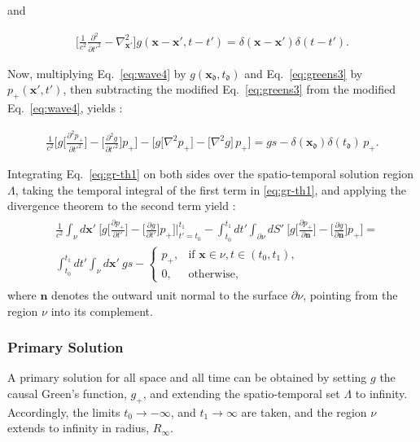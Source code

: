 \documentclass[11pt,reqno]{amsart}
\theoremstyle{remark}
\theoremstyle{italic_lemma}
\newcommand{\bx}{\boldsymbol{x}}
\newcommand{\bn}{\boldsymbol{n}}
\newcommand{\fd}{\mathfrak{d}}
\begin{document}
\noindent
and 

\begin{align}  \label{eq:greens3}
    \bigg[ \frac{1}{c^2} \frac{\partial^2}{\partial {t'}^2} - \nabla_{\bx'}^2 \bigg] g(\bx - \bx', t - t') = \delta(\bx - \bx') \delta(t - t').
\end{align}
\noindent


Now, multiplying Eq.~\eqref{eq:wave4} by $g(\bx_{\fd}, t_{\fd})$ and Eq.~\eqref{eq:greens3} by $p_+(\bx', t')$, then subtracting the modified Eq.~\eqref{eq:greens3} from the modified Eq.~\eqref{eq:wave4}, yields \cite{Devaney}:

\begin{align} \label{eq:gr-th1}
    \frac{1}{c^2} \bigg[g  \big[ \frac{\partial^2 p_+}{\partial {t'}^2} \big]
    - \big[ \frac{\partial^2 g}{\partial {t'}^2} \big] p_+ \bigg] 
    - \bigg[g \big[ \nabla^2 p_+\big] - \big[ \nabla^2 g \big] \, p_+ \bigg] = g s - \delta(\bx_{\fd}) \delta(t_{\fd}) \, p_+.
\end{align}


Integrating Eq.~\eqref{eq:gr-th1} on both sides over the spatio-temporal solution region \( \Lambda \), taking the temporal integral of the first term in \eqref{eq:gr-th1}, and applying the divergence theorem to the second term yield \cite{Devaney}:
\begin{align} \label{eq:gr-th2}
\begin{split}
    & \frac{1}{c^2} \int_\nu d\bx' \ 
    \bigg[g \big[ \frac{\partial p_+}{\partial t'} \big] - \big[ \frac{\partial g}{\partial t'} \big] p_+ \bigg] 
    \bigg|_{t' = t_0}^{t_1} 
    - \int_{t_0}^{t_1} \! dt' \int_{\partial \nu} \! dS' \ 
    \bigg[  g \big[ \frac{\partial p_+}{\partial \bn} \big]  - \big[ \frac{\partial g}{\partial \bn} \big] p_+  \bigg] = \\
    & \int_{t_0}^{t_1} \! dt' \int_\nu \! d\bx' \ g s - 
    \begin{cases}
        p_+, & \text{if } \bx \in \nu, t \in (t_0, t_1), \\
        0, & \text{otherwise},
    \end{cases}
\end{split}
\end{align}
where $\bn$ denotes the outward unit normal to the surface 
$\partial \nu$, pointing from the region $\nu$ into its complement.




\subsubsection{Primary Solution} \label{sec:gr-pri}
A primary solution for all space and all time can be obtained by setting \( g \) the causal Green's function, \( g_+ \), and extending the spatio-temporal set \( \Lambda \) to infinity. Accordingly, the limits \( t_0 \to -\infty \), and \( t_1 \to \infty \) are taken, and the region \( \nu \) extends to infinity in radius, \( R_{\infty} \).
\end{document}
